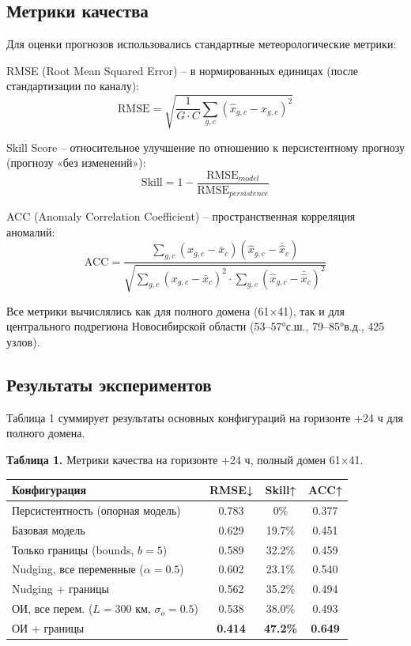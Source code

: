 \documentclass[14pt,a4paper]{extarticle}
\newcounter{none}
\numberwithin{table}{section}
\numberwithin{figure}{section}
\numberwithin{equation}{section}
\begin{document}
\subsection{Метрики качества}\label{ux43cux435ux442ux440ux438ux43aux438-ux43aux430ux447ux435ux441ux442ux432ux430}

Для оценки прогнозов использовались стандартные метеорологические
метрики:

RMSE (Root Mean Squared Error) -- в нормированных единицах
(после стандартизации по каналу):
\[\text{RMSE} = \sqrt{\frac{1}{G \cdot C} \sum_{g,c} \left(\hat{x}_{g,c} - x_{g,c}\right)^2}\]

Skill Score -- относительное улучшение по отношению к
персистентному прогнозу (прогнозу «без изменений»):
\[\text{Skill} = 1 - \frac{\text{RMSE}_{model}}{\text{RMSE}_{persistence}}\]

ACC (Anomaly Correlation Coefficient) -- пространственная
корреляция аномалий:
\[\text{ACC} = \frac{\sum_{g,c} (x_{g,c} - \bar{x}_c)(\hat{x}_{g,c} - \bar{\hat{x}}_c)}{\sqrt{\sum_{g,c}(x_{g,c}-\bar{x}_c)^2 \cdot \sum_{g,c}(\hat{x}_{g,c}-\bar{\hat{x}}_c)^2}}\]

Все метрики вычислялись как для полного домена (61×41), так и для
центрального подрегиона Новосибирской области (53--57°с.ш., 79--85°в.д.,
425 узлов).

\subsection{Результаты экспериментов}\label{ux440ux435ux437ux443ux43bux44cux442ux430ux442ux44b-ux44dux43aux441ux43fux435ux440ux438ux43cux435ux43dux442ux43eux432}

Таблица 1 суммирует результаты основных конфигураций на горизонте +24 ч
для полного домена.

\textbf{Таблица 1.} Метрики качества на горизонте +24 ч, полный домен
61×41.

{\def\LTcaptype{none} %
\begin{longtable}[]{@{}lccc@{}}
\toprule\noalign{}
Конфигурация & RMSE↓ & Skill↑ & ACC↑ \\
\midrule\noalign{}
\endhead
\bottomrule\noalign{}
\endlastfoot
Персистентность (опорная модель) & 0.783 & 0\% & 0.377 \\
Базовая модель & 0.629 & 19.7\% & 0.451 \\
Только границы (bounds, \(b=5\)) & 0.589 & 32.2\% & 0.459 \\
Nudging, все переменные (\(\alpha=0.5\)) & 0.602 & 23.1\% & 0.540 \\
Nudging + границы & 0.562 & 35.2\% & 0.494 \\
ОИ, все перем. (\(L=300\) км, \(\sigma_o=0.5\)) & 0.538 & 38.0\% &
0.493 \\
ОИ + границы & \textbf{0.414} & \textbf{47.2\%} &
\textbf{0.649} \\
\end{longtable}
}
\end{document}
